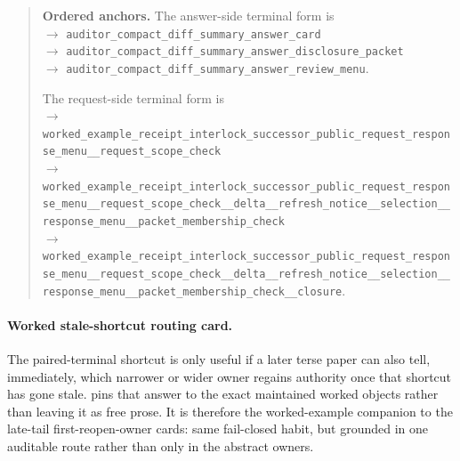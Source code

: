 \documentclass[11pt]{article}
\begin{document}
\begin{quote}\small
\textbf{Ordered anchors.}
The answer-side terminal form is
\\
$\to$ \texttt{auditor\_compact\_diff\_summary\_answer\_card}\\
$\to$ \texttt{auditor\_compact\_diff\_summary\_answer\_disclosure\_packet}\\
$\to$ \texttt{auditor\_compact\_diff\_summary\_answer\_review\_menu}.

\smallskip
\noindent The request-side terminal form is
\\
$\to$ \texttt{worked\_example\_receipt\_interlock\_successor\_public\_request\_response\_menu\_\_request\_scope\_check}\\
$\to$ \texttt{worked\_example\_receipt\_interlock\_successor\_public\_request\_response\_menu\_\_request\_scope\_check\_\_delta\_\_refresh\_notice\_\_selection\_\_response\_menu\_\_packet\_membership\_check}\\
$\to$ \texttt{worked\_example\_receipt\_interlock\_successor\_public\_request\_response\_menu\_\_request\_scope\_check\_\_delta\_\_refresh\_notice\_\_selection\_\_response\_menu\_\_packet\_membership\_check\_\_closure}.
\end{quote}

\paragraph{Worked stale-shortcut routing card.}
The paired-terminal shortcut is only useful if a later terse paper can also tell, immediately, which narrower or wider owner regains authority once that shortcut has gone stale.
 pins that answer to the exact maintained worked objects rather than leaving it as free prose.
It is therefore the worked-example companion to the late-tail first-reopen-owner cards: same fail-closed habit, but grounded in one auditable route rather than only in the abstract owners.\cite{series:challengeanswerreviewmenus,series:publicrequestresponsepackets,series:publicrequestresponsepacketcarryforward,series:publicrequestresponsepacketdeltas,series:publicrequestresponsepacketrefreshnotices,series:publicrequestresponsepacketrefreshnoticenormalforms,series:publicrequestresponsepacketrefreshnoticeselections,series:publicrequestresponsepacketrefreshresponsemenus,series:publicrequestresponsepacketrefreshresponsepackets,series:publicrequestresponsepacketrefreshresponsepacketclosureverdicts,series:pairedterminalcitationdiscipline,series:pairedterminalcutoverrules}
\end{document}
